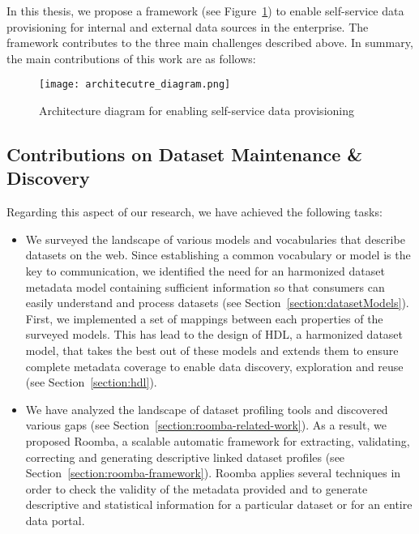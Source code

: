In this thesis, we propose a framework (see Figure~\ref{fig:architecutre_diagram}) to enable self-service data provisioning for internal and external data sources in the enterprise. The framework contributes to the three main challenges described above. In summary, the main contributions of this work are as follows:

\begin{adjustwidth}{-.4in}{-.4in}
	\begin{figure}[!ht]
	  \centering
	  \texttt{[image: architecutre\_diagram.png]}
	  \caption{Architecture diagram for enabling self-service data provisioning}
	  \label{fig:architecutre_diagram}
	\end{figure}
\end{adjustwidth}

\subsection{Contributions on Dataset Maintenance \& Discovery}

Regarding this aspect of our research, we have achieved the following tasks:
\begin{itemize}
	\item We surveyed the landscape of various models and vocabularies that describe datasets on the web. Since establishing a common vocabulary or model is the key to communication, we identified the need for an harmonized dataset metadata model containing sufficient information so that consumers can easily understand and process datasets (see Section~\ref{section:datasetModels}). First, we implemented a set of mappings between each properties of the surveyed models. This has lead to the design of HDL, a harmonized dataset model, that takes the best out of these models and extends them to ensure complete metadata coverage to enable data discovery, exploration and reuse (see Section~\ref{section:hdl}).
	\item We have analyzed the landscape of dataset profiling tools and discovered various gaps (see Section~\ref{section:roomba-related-work}). As a result, we proposed Roomba, a scalable automatic framework for extracting, validating, correcting and generating descriptive linked dataset profiles (see Section~\ref{section:roomba-framework}). Roomba applies several techniques in order to check the validity of the metadata provided and to generate descriptive and statistical information for a particular dataset or for an entire data portal.
\end{itemize}

